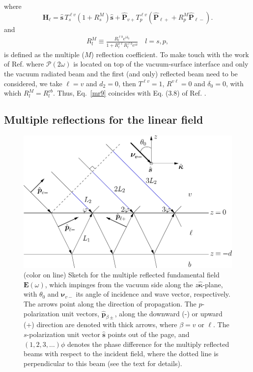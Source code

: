 where
\begin{equation}\label{mr9}
\mathbf{H}_{\ell}
= \hat{\mathbf{s}}\,T_s^{\ell v}
\left(1+
R^M_s
\right)
\hat{\mathbf{s}}
+ \hat{\mathbf{P}}_{v+}T_{p}^{\ell v}
\left(
\hat{\mathbf{P}}_{\ell +} +
R^M_p
 \hat{\mathbf{P}}_{\ell -}
\right). 
\end{equation}
and
\begin{align}\label{m61}
R^M_l\equiv\frac{R^{\ell b}_le^{i\delta_{0}}}{1+R^{v\ell}_l R^{\ell b}_l e^{i\delta}}
\quad l=s,p
,
\end{align}
is defined as the multiple ($M$) reflection coefficient.
To make touch with the work of Ref. \cite{mizrahiJOSA88} where
$\boldsymbol{\mathcal{P}}(2\omega)$ is located on top of the
vacuum-surface interface and only the vacuum radiated beam and the
first (and only) reflected beam need to be considered, we take
$\ell=v$ and $d_2=0$, then 
$T^{\ell v}=1$, $R^{v\ell}=0$ and $\delta_{0}=0$, with which
$R^M_l=R^{vb}_l$. 
Thus, Eq.~\eqref{mr9} coincides with Eq. (3.8) of
Ref. \cite{mizrahiJOSA88}. 

\subsection{Multiple reflections for the linear field}
\begin{figure}[t]
\centering 
\includegraphics[scale=.5]{figures/diag-3layer_MR_1w}
\caption{(color on line) Sketch for the multiple reflected  fundamental field
$\mathbf{E}(\omega)$, which impinges from the vacuum side along the
$z\hat{\boldsymbol{\kappa}}$-plane, with $\theta_{0}$ and $\boldsymbol{\nu}_{v-}$
its angle of incidence and wave vector, respectively. The arrows point along the
direction of propagation. The $p$-polarization unit vectors, $\hat{\mathbf{p}}_{\beta
\pm}$, along the downward (-) or upward (+) direction are denoted with thick
arrows, where $\beta=v$ or $\ell$. The $s$-polarization unit vector $\hat{\mathbf{s}}$
points out of the page, and $(1,2,3,\dots)\phi$ denotes the phase difference for
the multiply reflected beams with respect to the incident field, where the
dotted line is perpendicular to this beam (see the text for
details).\label{linear}}
\end{figure}

